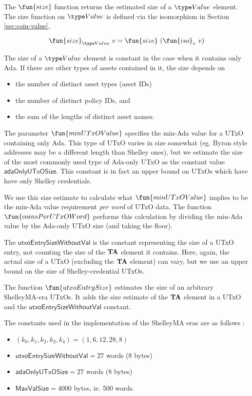 The $\fun{size}$ function returns the estimated size of a $\Value$ element. The size
function on $\Value$ is defined via the isomorphism in Section \ref{sec:coin-value},

\[ \fun{size}_{\Value}~v=\fun{size}~(\fun{iso}_{v}~v) \]

The size of a $\Value$ element is constant in the case when it contains only Ada.
If there are other types of assets contained in it, the size depends on

\begin{itemize}
  \item the number of distinct asset types (asset IDs)
  \item the number of distinct policy IDs, and
  \item the sum of the lengths of distinct asset names.
\end{itemize}

The parameter $\fun{minUTxOValue}$ specifies the min-Ada value for a UTxO containing
only Ada. This type of UTxO varies in size somewhat (eg. Byron style addresses
may be a different length than Shelley ones), but we estimate the size of the most commonly
used type of Ada-only UTxO as the constant value $\mathsf{adaOnlyUTxOSize}$.
This constant is in fact an upper bound on UTxOs which have have only Shelley credentials.

We use this size estimate
to calculate what $\fun{minUTxOValue}$ implies to be the min-Ada value requirement
\emph{per word} of UTxO data.
The function $\fun{coinsPerUTxOWord}$ performs this calculation by dividing the
min-Ada value by the Ada-only UTxO size (and taking the floor).

The $\mathsf{utxoEntrySizeWithoutVal}$ is the constant representing
the size of a UTxO entry, not counting the size of the $\mathbf{TA}$ element it contains.
Here, again, the actual size of a UTxO (excluding the $\mathbf{TA}$ element) can vary, but
we use an upper bound on the size of Shelley-credential UTxOs.

The function $\fun{utxoEntrySize}$ estimates the size of an arbitrary ShelleyMA-era
UTxOs. It adds the size estimate of the $\mathbf{TA}$ element in a UTxO and the
$\mathsf{utxoEntrySizeWithoutVal}$ constant.

The constants used in the implementation of the ShelleyMA eras are as follows :

\begin{itemize}
  \item $(k_0, k_1, k_2, k_3, k_4) = (1, 6, 12, 28, 8)$
  \item $\mathsf{utxoEntrySizeWithoutVal} = 27$ words (8 bytes)
  \item $\mathsf{adaOnlyUTxOSize} = 27$ words (8 bytes)
  \item $\mathsf{MaxValSize} = 4000$ bytes, ie. 500 words.
\end{itemize}
